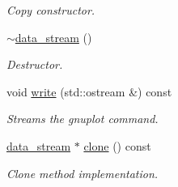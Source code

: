 \begin{DoxyCompactItemize}
\begin{DoxyCompactList}\small\item\em Copy constructor. \end{DoxyCompactList}\item 
\hypertarget{a00115_a9d0a6d6486e6435cc154ee864e769272}{}\hyperlink{a00115_a9d0a6d6486e6435cc154ee864e769272}{$\sim$data\+\_\+stream} ()\label{a00115_a9d0a6d6486e6435cc154ee864e769272}

\begin{DoxyCompactList}\small\item\em Destructor. \end{DoxyCompactList}\item 
\hypertarget{a00115_ad2c77ea77b290ce3cc0290455960dad4}{}void \hyperlink{a00115_ad2c77ea77b290ce3cc0290455960dad4}{write} (std\+::ostream \&) const \label{a00115_ad2c77ea77b290ce3cc0290455960dad4}

\begin{DoxyCompactList}\small\item\em Streams the gnuplot command. \end{DoxyCompactList}\item 
\hypertarget{a00115_af05ed243a7f75a7a7362a7f09f343a41}{}\hyperlink{a00115}{data\+\_\+stream} $\ast$ \hyperlink{a00115_af05ed243a7f75a7a7362a7f09f343a41}{clone} () const \label{a00115_af05ed243a7f75a7a7362a7f09f343a41}

\begin{DoxyCompactList}\small\item\em Clone method implementation. \end{DoxyCompactList}\end{DoxyCompactItemize}
